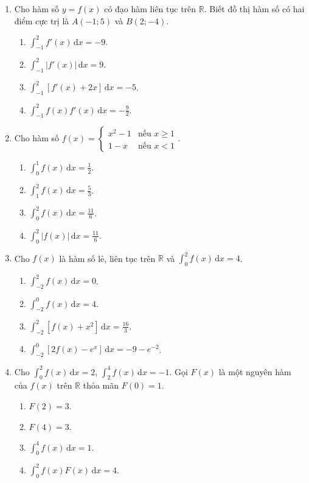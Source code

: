 \documentclass[12pt]{article}
\begin{document}
\begin{enumerate}[label=\textbf{Câu \arabic*.}]
		\item Cho hàm số $y = f(x)$ có đạo hàm liên tục trên $\mathbb{R}$. Biết đồ thị hàm số có hai điểm cực trị là $A(-1; 5)$ và $B(2; -4)$.
		\begin{enumerate}[label=\alph*)]
			\item $\displaystyle \int_{-1}^2 f'(x)\,\mathrm{d}x = -9$.
			\item $\displaystyle \int_{-1}^2 |f'(x)|\,\mathrm{d}x = 9$.
			\item $\displaystyle \int_{-1}^2 [f'(x) + 2x]\,\mathrm{d}x = -5$.
			\item $\displaystyle \int_{-1}^2 f(x)f'(x)\,\mathrm{d}x = -\frac{9}{2}$.
		\end{enumerate}
		
		\item Cho hàm số $f(x) = \begin{cases} x^2 - 1 & \text{nếu } x \ge 1 \\ 1 - x & \text{nếu } x < 1 \end{cases}$.
		\begin{enumerate}[label=\alph*)]
			\item $\displaystyle \int_0^1 f(x)\,\mathrm{d}x = \frac{1}{2}$.
			\item $\displaystyle \int_1^2 f(x)\,\mathrm{d}x = \frac{5}{3}$.
			\item $\displaystyle \int_0^2 f(x)\,\mathrm{d}x = \frac{11}{6}$.
			\item $\displaystyle \int_0^2 |f(x)|\,\mathrm{d}x = \frac{11}{6}$.
		\end{enumerate}
		
		\item Cho $f(x)$ là hàm số lẻ, liên tục trên $\mathbb{R}$ và $\displaystyle \int_0^2 f(x)\,\mathrm{d}x = 4$.
		\begin{enumerate}[label=\alph*)]
			\item $\displaystyle \int_{-2}^2 f(x)\,\mathrm{d}x = 0$.
			\item $\displaystyle \int_{-2}^0 f(x)\,\mathrm{d}x = 4$.
			\item $\displaystyle \int_{-2}^2 [f(x) + x^2]\,\mathrm{d}x = \frac{16}{3}$.
			\item $\displaystyle \int_{-2}^0 [2f(x) - e^x]\,\mathrm{d}x = -9 - e^{-2}$.
		\end{enumerate}
		
		\item Cho $\displaystyle \int_0^2 f(x)\,\mathrm{d}x = 2$, $\displaystyle \int_2^4 f(x)\,\mathrm{d}x = -1$. Gọi $F(x)$ là một nguyên hàm của $f(x)$ trên $\mathbb{R}$ thỏa mãn $F(0) = 1$.
		\begin{enumerate}[label=\alph*)]
			\item $F(2) = 3$.
			\item $F(4) = 3$.
			\item $\displaystyle \int_0^4 f(x)\,\mathrm{d}x = 1$.
			\item $\displaystyle \int_0^2 f(x)F(x)\,\mathrm{d}x = 4$.
		\end{enumerate}
		

\end{enumerate}
\end{document}
